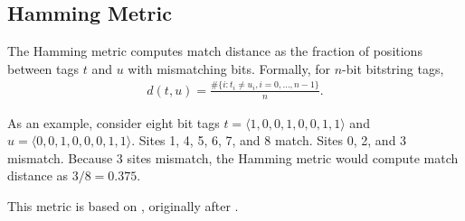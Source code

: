 \subsection{Hamming Metric} \label{sec:hamming}

The Hamming metric computes match distance as the fraction of positions between tags $t$ and $u$ with mismatching bits.
Formally, for $n$-bit bitstring tags,
\begin{align*}
d(t, u)
= \frac{
  \#\{ i : t_i \neq u_i, i=0, \dots ,n-1\}
}{
  n
}.
\end{align*}

As an example, consider eight bit tags $t = \langle 1, 0, 0, 1, 0, 0, 1, 1 \rangle$ and $u = \langle 0, 0, 1, 0, 0, 0, 1, 1 \rangle$.
Sites 1, 4, 5, 6, 7, and 8 match.
Sites 0, 2, and 3 mismatch.
Because 3 sites mismatch, the Hamming metric would compute match distance as $3 / 8 = 0.375$.

This metric is based on \cite{lalejini2019else}, originally after \cite{hamming1950error}.
